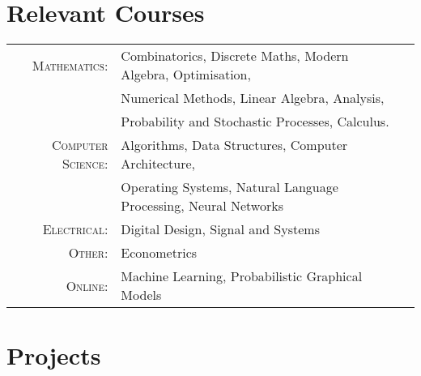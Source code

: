 \documentclass[a4paper,10pt]{article} %
\begin{document}
\section{Relevant Courses}

\begin{tabular}{rlp{5cm}}

\textsc{Mathematics:} & Combinatorics, Discrete Maths, Modern Algebra, Optimisation,
\\&  Numerical Methods, Linear Algebra, Analysis, 
\\ & Probability and Stochastic Processes, Calculus.\\

\textsc{Computer Science:} & Algorithms, Data Structures, Computer Architecture,
\\ & Operating Systems, Natural Language Processing, Neural Networks  \\

\textsc{Electrical:} & Digital Design, Signal and Systems\\

\textsc{Other:} &Econometrics\\

\textsc{Online:} & Machine Learning, Probabilistic Graphical Models\\
\end{tabular}



\section{Projects}
\end{document}
